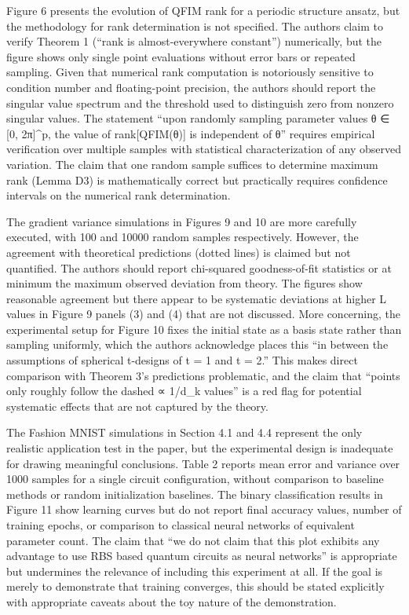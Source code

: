 \documentclass[10pt,letterpaper]{article}
\begin{document}
Figure 6 presents the evolution of QFIM rank for a periodic structure ansatz, but the methodology for rank determination is not specified. The authors claim to verify Theorem 1 (``rank is almost-everywhere constant'') numerically, but the figure shows only single point evaluations without error bars or repeated sampling. Given that numerical rank computation is notoriously sensitive to condition number and floating-point precision, the authors should report the singular value spectrum and the threshold used to distinguish zero from nonzero singular values. The statement ``upon randomly sampling parameter values θ ∈ {[}0, 2π{]}\^{}p, the value of rank{[}QFIM(θ){]} is independent of θ'' requires empirical verification over multiple samples with statistical characterization of any observed variation. The claim that one random sample suffices to determine maximum rank (Lemma D3) is mathematically correct but practically requires confidence intervals on the numerical rank determination.

The gradient variance simulations in Figures 9 and 10 are more carefully executed, with 100 and 10000 random samples respectively. However, the agreement with theoretical predictions (dotted lines) is claimed but not quantified. The authors should report chi-squared goodness-of-fit statistics or at minimum the maximum observed deviation from theory. The figures show reasonable agreement but there appear to be systematic deviations at higher L values in Figure 9 panels (3) and (4) that are not discussed. More concerning, the experimental setup for Figure 10 fixes the initial state as a basis state rather than sampling uniformly, which the authors acknowledge places this ``in between the assumptions of spherical t-designs of t = 1 and t = 2.'' This makes direct comparison with Theorem 3's predictions problematic, and the claim that ``points only roughly follow the dashed ∝ 1/d\_k values'' is a red flag for potential systematic effects that are not captured by the theory.

The Fashion MNIST simulations in Section 4.1 and 4.4 represent the only realistic application test in the paper, but the experimental design is inadequate for drawing meaningful conclusions. Table 2 reports mean error and variance over 1000 samples for a single circuit configuration, without comparison to baseline methods or random initialization baselines. The binary classification results in Figure 11 show learning curves but do not report final accuracy values, number of training epochs, or comparison to classical neural networks of equivalent parameter count. The claim that ``we do not claim that this plot exhibits any advantage to use RBS based quantum circuits as neural networks'' is appropriate but undermines the relevance of including this experiment at all. If the goal is merely to demonstrate that training converges, this should be stated explicitly with appropriate caveats about the toy nature of the demonstration.
\end{document}
